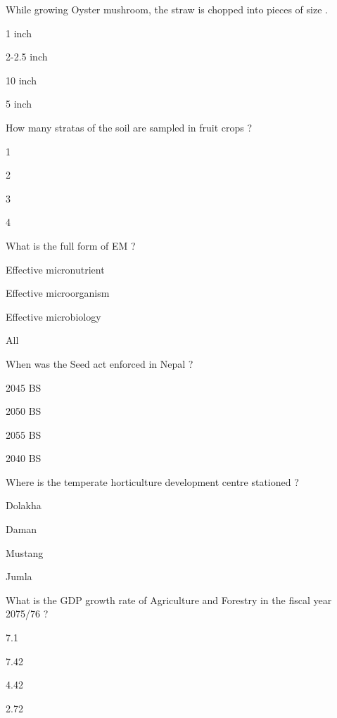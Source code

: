 \begin{questions}
\question While growing Oyster mushroom, the straw is chopped into pieces of size \fillin[][3cm].
\begin{items}
\item 1 inch
\item* 2-2.5 inch
\item 10 inch
\item 5 inch
\end{items}

\question How many stratas of the soil are sampled in fruit crops ?
\begin{items}
\item 1
\item 2
\item 3
\item 4
\end{items}

\question What is the full form of EM ?
\begin{items}
\item Effective micronutrient
\item* Effective microorganism
\item Effective microbiology
\item All
\end{items}

\question When was the Seed act enforced in Nepal ?
\begin{items}
\item* 2045 BS
\item 2050 BS
\item 2055 BS
\item 2040 BS
\end{items}

\question Where is the temperate horticulture development centre stationed ?
\begin{items}
\item Dolakha
\item Daman
\item* Mustang
\item Jumla
\end{items}

\question What is the GDP growth rate of Agriculture and Forestry in the fiscal year 2075/76 ?
\begin{items}
\item 7.1
\item 7.42
\item 4.42
\item* 2.72
\end{items}


\end{questions}
